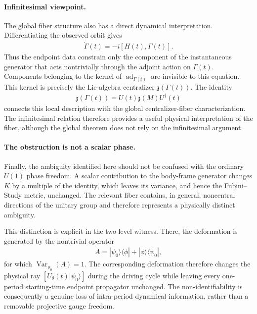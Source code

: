 \documentclass[twocolumn,prl,aps,floatfix]{revtex4-2}
\begin{document}
\paragraph{Infinitesimal viewpoint.}
The global fiber structure also has a direct dynamical interpretation. Differentiating the observed orbit gives
\begin{align}
\dot{\Gamma}(t)=-i[H(t),\Gamma(t)].
\end{align}
Thus the endpoint data constrain only the component of the instantaneous generator that acts nontrivially through the adjoint action on $\Gamma(t)$. Components belonging to the kernel of
$\operatorname{ad}_{\Gamma(t)}$ are invisible to this equation. This kernel is precisely the Lie-algebra centralizer
$\mathfrak z(\Gamma(t))$. The identity
\begin{align}
\mathfrak z(\Gamma(t))
=
U(t)\mathfrak z(M)U^\dagger(t)
\end{align}
connects this local description with the global centralizer-fiber characterization. The infinitesimal relation therefore provides a useful physical interpretation of the fiber, although the global theorem does not rely on the infinitesimal argument.

\paragraph{The obstruction is not a scalar phase.}
Finally, the ambiguity identified here should not be confused with the ordinary $U(1)$ phase freedom. A scalar contribution to the body-frame generator changes $K$ by a multiple of the identity, which leaves its variance, and hence the Fubini--Study metric, unchanged. The relevant fiber contains, in general, noncentral directions of the unitary group and therefore represents a physically distinct ambiguity.

This distinction is explicit in the two-level witness. There, the deformation is generated by the nontrivial operator
\begin{align}
A=
|\psi_0\rangle\langle\phi|
+
|\phi\rangle\langle\psi_0|,
\end{align}
for which
$\operatorname{Var}_{\rho_0}(A)=1$. The corresponding deformation therefore changes the physical ray
$[U_\theta(t)|\psi_0\rangle]$ during the driving cycle while leaving every one-period starting-time endpoint propagator unchanged. The non-identifiability is consequently a genuine loss of intra-period dynamical information, rather than a removable projective gauge freedom.
\end{document}
